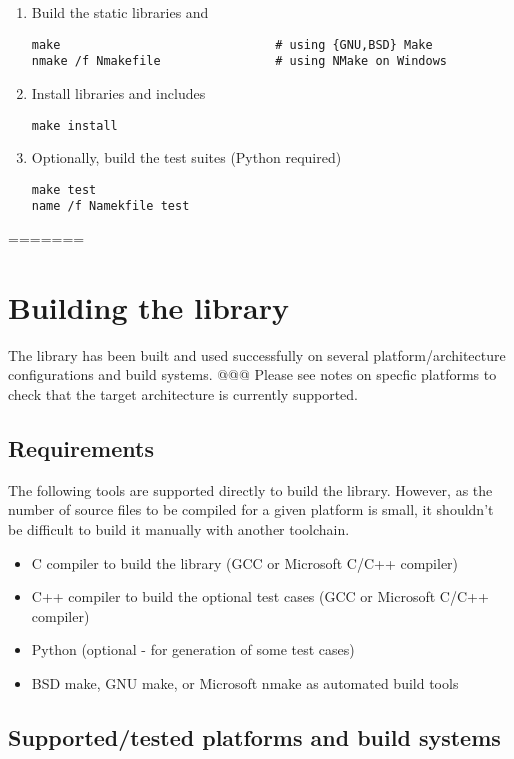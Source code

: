 \begin{enumerate}
\item Build the static libraries  and 
\begin{lstlisting}
make                              # using {GNU,BSD} Make
nmake /f Nmakefile                # using NMake on Windows
\end{lstlisting}
\item Install libraries and includes
\begin{lstlisting}
make install 
\end{lstlisting}
\item Optionally, build the test suites (Python required)
\begin{lstlisting}
make test
name /f Namekfile test
\end{lstlisting}
\end{enumerate}

=======
\newpage
\section{Building the library}

The library has been built and used successfully on several 
platform/architecture configurations and build systems.
@@@ Please see notes on specfic platforms to check that the target
architecture is currently supported.


\subsection{Requirements}

The following tools are supported directly to build the  library.
However, as the number of source files to be compiled for a given
platform is small, it shouldn't be difficult to build it manually with
another toolchain.
\begin{itemize}
\item C compiler to build the  library (GCC or Microsoft C/C++ compiler)
\item C++ compiler to build the optional test cases (GCC or Microsoft C/C++ compiler)
\item Python (optional - for generation of some test cases)
\item BSD make, GNU make, or Microsoft nmake as automated build tools
\end{itemize}


\subsection{Supported/tested platforms and build systems}

